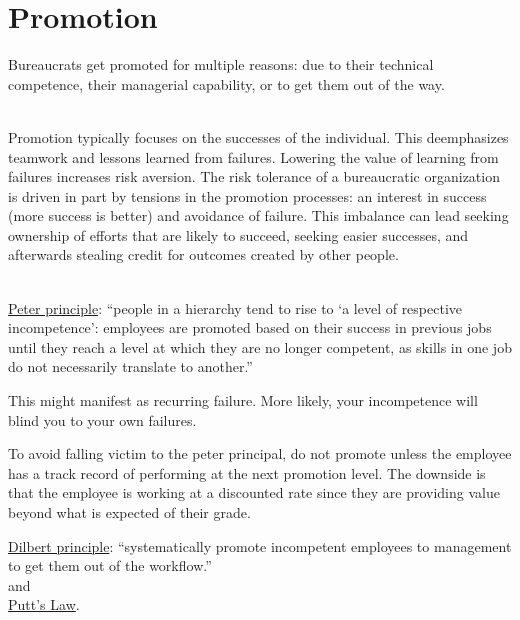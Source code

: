 \section{Promotion\label{sec:promotion}}

Bureaucrats get promoted for multiple reasons: due to their technical competence, their managerial capability, or to get them out of the way.

\ \\

Promotion typically focuses on the successes of the individual. This deemphasizes teamwork and lessons learned from failures. Lowering the value of learning from failures increases risk aversion. The risk tolerance of a bureaucratic organization is driven in part by tensions in the promotion processes: an interest in success (more success is better) and avoidance of failure. This imbalance can lead seeking ownership of efforts that are likely to succeed, seeking easier successes, and afterwards stealing credit for outcomes created by other people. 

\ \\

\href{https://en.wikipedia.org/wiki/Peter_principle}{Peter principle}: ``people in a hierarchy tend to rise to `a level of respective incompetence': employees are promoted based on their success in previous jobs until they reach a level at which they are no longer competent, as skills in one job do not necessarily translate to another.''

This might manifest as recurring failure. More likely, your incompetence will blind you to your own failures.

To avoid falling victim to the peter principal, do not promote unless the employee has a track record of performing at the next promotion level. The downside is that the employee is working at a discounted rate since they are providing value beyond what is expected of their grade.


\href{https://en.wikipedia.org/wiki/Dilbert_principle}{Dilbert principle}: ``systematically promote incompetent employees to management to get them out of the workflow.''\\
and\\
\href{https://en.wikipedia.org/wiki/Putt\%27s_Law_and_the_Successful_Technocrat}{Putt's Law}.





